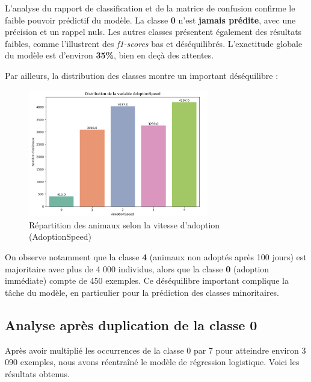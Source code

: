 \documentclass[a4paper,12pt]{article}
\begin{document}
L'analyse du rapport de classification et de la matrice de confusion confirme le faible pouvoir prédictif du modèle. La classe \textbf{0} n'est \textbf{jamais prédite}, avec une précision et un rappel nuls. Les autres classes présentent également des résultats faibles, comme l'illustrent des \textit{f1-scores} bas et déséquilibrés. L'exactitude globale du modèle est d’environ \textbf{35\%}, bien en deçà des attentes.

Par ailleurs, la distribution des classes montre un important déséquilibre :

\begin{figure}[H]

    \centering

    \includegraphics[width=0.7\textwidth]{adoption_speed_distribution.png}

    \caption{Répartition des animaux selon la vitesse d’adoption (AdoptionSpeed)}

    \label{fig:adoption_speed}

\end{figure}

On observe notamment que la classe \textbf{4} (animaux non adoptés après 100 jours) est majoritaire avec plus de 4 000 individus, alors que la classe \textbf{0} (adoption immédiate) compte  de 450 exemples. Ce déséquilibre important complique la tâche du modèle, en particulier pour la prédiction des classes minoritaires.



\subsection{Analyse après duplication de la classe 0}
 
Après avoir multiplié les occurrences de la classe 0 par 7 pour atteindre environ 3 090 exemples, nous avons réentraîné le modèle de régression logistique. Voici les résultats obtenus.
 
\end{document}
